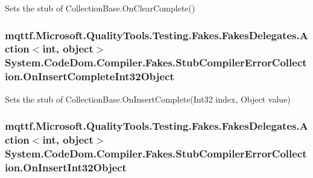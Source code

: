 Sets the stub of Collection\-Base.\-On\-Clear\-Complete()

\hypertarget{class_system_1_1_code_dom_1_1_compiler_1_1_fakes_1_1_stub_compiler_error_collection_ad750c1ce96cf9de26f4dfec945f88d4c}{
\subsubsection[{On\-Insert\-Complete\-Int32\-Object}]{\setlength{\rightskip}{0pt plus 5cm}mqttf.\-Microsoft.\-Quality\-Tools.\-Testing.\-Fakes.\-Fakes\-Delegates.\-Action$<$int, object$>$ System.\-Code\-Dom.\-Compiler.\-Fakes.\-Stub\-Compiler\-Error\-Collection.\-On\-Insert\-Complete\-Int32\-Object}}\label{class_system_1_1_code_dom_1_1_compiler_1_1_fakes_1_1_stub_compiler_error_collection_ad750c1ce96cf9de26f4dfec945f88d4c}


Sets the stub of Collection\-Base.\-On\-Insert\-Complete(\-Int32 index, Object value)

\hypertarget{class_system_1_1_code_dom_1_1_compiler_1_1_fakes_1_1_stub_compiler_error_collection_a2b70944179199045d01aa5c878fab877}{
\subsubsection[{On\-Insert\-Int32\-Object}]{\setlength{\rightskip}{0pt plus 5cm}mqttf.\-Microsoft.\-Quality\-Tools.\-Testing.\-Fakes.\-Fakes\-Delegates.\-Action$<$int, object$>$ System.\-Code\-Dom.\-Compiler.\-Fakes.\-Stub\-Compiler\-Error\-Collection.\-On\-Insert\-Int32\-Object}}\label{class_system_1_1_code_dom_1_1_compiler_1_1_fakes_1_1_stub_compiler_error_collection_a2b70944179199045d01aa5c878fab877}



